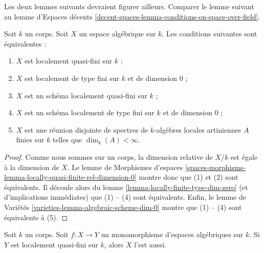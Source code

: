 \noindent
Les deux lemmes suivants devraient figurer ailleurs.
Comparer le lemme suivant au
lemme d'Espaces décents \ref{decent-spaces-lemma-conditions-on-space-over-field}.

\begin{lemma}
\label{lemma-locally-quasi-finite-over-field}
Soit $k$ un corps. Soit $X$ un espace algébrique sur $k$.
Les conditions suivantes sont équivalentes :
\begin{enumerate}
\item $X$ est localement quasi-fini sur $k$ ;
\item $X$ est localement de type fini sur $k$ et de dimension $0$ ;
\item $X$ est un schéma localement quasi-fini sur $k$ ;
\item $X$ est un schéma localement de type fini sur $k$ et de
dimension $0$ ;
\item $X$ est une réunion disjointe de spectres de $k$-algèbres locales artiniennes
$A$ finies sur $k$ telles que $\dim_k(A) < \infty$.
\end{enumerate}
\end{lemma}

\begin{proof}
Comme nous sommes sur un corps, la dimension relative de $X/k$ est égale à
la dimension de $X$. Le
lemme de Morphismes d'espaces
\ref{spaces-morphisms-lemma-locally-quasi-finite-rel-dimension-0}
montre donc que (1) et (2) sont équivalents. Il découle alors du
lemme \ref{lemma-locally-finite-type-dim-zero}
(et d'implications immédiates) que (1) -- (4) sont équivalents.
Enfin, le
lemme de Variétés \ref{varieties-lemma-algebraic-scheme-dim-0}
montre que (1) -- (4) sont équivalents à (5).
\end{proof}

\begin{lemma}
\label{lemma-mono-towards-locally-quasi-finite-over-field}
Soit $k$ un corps. Soit $f : X \to Y$ un monomorphisme d'espaces algébriques
sur $k$. Si $Y$ est localement quasi-fini sur $k$, alors $X$ l'est aussi.
\end{lemma}

